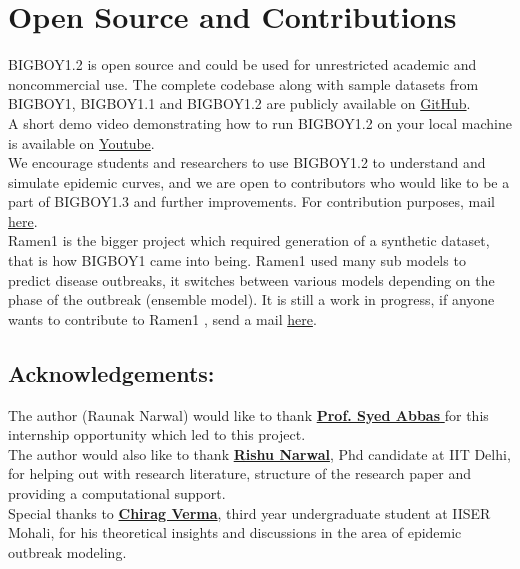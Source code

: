\documentclass[11pt,a4paper]{article}
\theoremstyle{remark}\newtheorem{remark}{Remark}
\begin{document}
\section{Open Source and Contributions}
BIGBOY1.2 is open source and could be used for unrestricted academic and noncommercial use. The complete codebase along with sample datasets from BIGBOY1, BIGBOY1.1 and BIGBOY1.2 are publicly available on \href{https://github.com/RaunakNarwal735/BIGBOY1.1}{GitHub}. \\
A short demo video demonstrating how to run BIGBOY1.2 on your local machine is available on \href{https://www.youtube.com/watch?v=jOsmuO00low}{Youtube}. \\
We encourage students and researchers to use BIGBOY1.2 to understand and simulate epidemic curves, and we are open to contributors who would like to be a part of BIGBOY1.3 and further improvements. For contribution purposes, mail \href{mailto:ms23177@iisermohali.ac.in}{here}. \\
Ramen1 is the bigger project which required generation of a synthetic dataset, that is how BIGBOY1 came into being. Ramen1 used many sub models to predict disease outbreaks, it switches between various models depending on the phase of the outbreak (ensemble model). It is still a work in progress,  if anyone wants to contribute to Ramen1 , send a mail \href{mailto:ms23177@iisermohali.ac.in}{here}. 

\subsection{Acknowledgements: } The author (Raunak Narwal) would like to thank \href{mailto:abbas@iitmandi.ac.in}{\textbf{Prof. Syed Abbas} }for this internship opportunity which led to this project.\\
The author would also like to thank \href{mailto:Rishunarwal24@gmail.com}{ \textbf{Rishu Narwal}}, Phd candidate at IIT Delhi, for  helping out with research literature, structure of the research paper and providing a computational support.\\
Special thanks to \href{mailto:ms23089@iisermohali.ac.in}{\textbf{Chirag Verma}}, third year undergraduate student at IISER Mohali, for his theoretical insights and discussions in the area of epidemic outbreak modeling.

 
  
\end{document}
